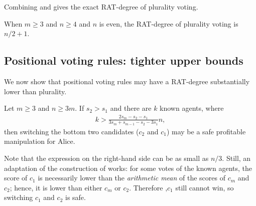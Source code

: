 Combining  and 
 gives the exact RAT-degree of plurality voting.
\begin{corollary}
When $m\geq 3$ and $n\geq 4$ and $n$ is even, the RAT-degree of plurality voting is $n/2+1$.    
\end{corollary}

\subsection{Positional voting rules: tighter upper bounds}

We now show that positional voting rules may have a RAT-degree substantially lower than plurality.

\iffalse %
\begin{lemmarep}
\label{lem:b:s2>s1}
Let $m\geq 3$ and $n\geq 3m$.
If $s_2 > s_1$ and there are $k$ known agents,
where 
\begin{align*}
k > \frac{2 s_m - s_2 - s_1}    {3 s_m + s_{m-1} - s_2 - 3 s_1} n,
\end{align*}
then
switching the bottom two candidates ($c_2$ and $c_1$) may be a safe profitable manipulation for Alice.
\end{lemmarep}
\begin{proofsketch}
Note that the expression on the right-hand side can be as small as $n/3$. 
Still, an adaptation of the construction of  works: for some votes of the known agents,
the score of $c_1$ is necessarily lower than the \emph{arithmetic mean} of the scores of $c_m$ and $c_2$; hence, it is lower than either $c_m$ or $c_2$.
Therefore ,$c_1$ still cannot win, so switching $c_1$ and $c_2$ is safe.
\end{proofsketch}
